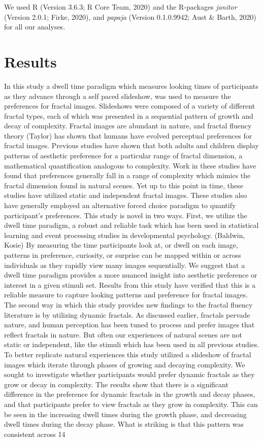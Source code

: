 \documentclass[english,jou]{apa6}
\begin{document}
We used R (Version 3.6.3; R Core Team, 2020) and the R-packages \emph{janitor} (Version 2.0.1; Firke, 2020), and \emph{papaja} (Version 0.1.0.9942; Aust \& Barth, 2020) for all our analyses.

\hypertarget{results}{%
\section{Results}\label{results}}

In this study a dwell time paradigm which measures looking times of participants as they advance through a self paced slideshow, was used to measure the preferences for fractal images. Slideshows were composed of a variety of different fractal types, each of which was presented in a sequential pattern of growth and decay of complexity. Fractal images are abundant in nature, and fractal fluency theory (Taylor) has shown that humans have evolved perceptual preferences for fractal images. Previous studies have shown that both adults and children display patterns of aesthetic preference for a particular range of fractal dimension, a mathematical quantification analogous to complexity. Work in these studies have found that preferences generally fall in a range of complexity which mimics the fractal dimension found in natural scenes. Yet up to this point in time, these studies have utilized static and independent fractal images. These studies also have generally employed an alternative forced choice paradigm to quantify participant's preferences. This study is novel in two ways. First, we utilize the dwell time paradigm, a robust and reliable task which has been used in statistical learning and event processing studies in developmental psychology. (Baldwin, Kosie) By measuring the time participants look at, or dwell on each image, patterns in preference, curiosity, or surprise can be mapped within or across individuals as they rapidly view many images sequentially. We suggest that a dwell time paradigm provides a more nuanced insight into aesthetic preference or interest in a given stimuli set. Results from this study have verified that this is a reliable measure to capture looking patterns and preference for fractal images. The second way in which this study provides new findings to the fractal fluency literature is by utilizing dynamic fractals. As discussed earlier, fractals pervade nature, and human perception has been tuned to process and prefer images that reflect fractals in nature. But often our experiences of natural scenes are not static or independent, like the stimuli which has been used in all previous studies. To better replicate natural experiences this study utilized a slideshow of fractal images which iterate through phases of growing and decaying complexity. We sought to investigate whether participants would prefer dynamic fractals as they grow or decay in complexity. The results show that there is a significant difference in the preference for dynamic fractals in the growth and decay phases, and that participants prefer to view fractals as they grow in complexity. This can be seen in the increasing dwell times during the growth phase, and decreasing dwell times during the decay phase. What is striking is that this pattern was consistent across 14 
\end{document}
